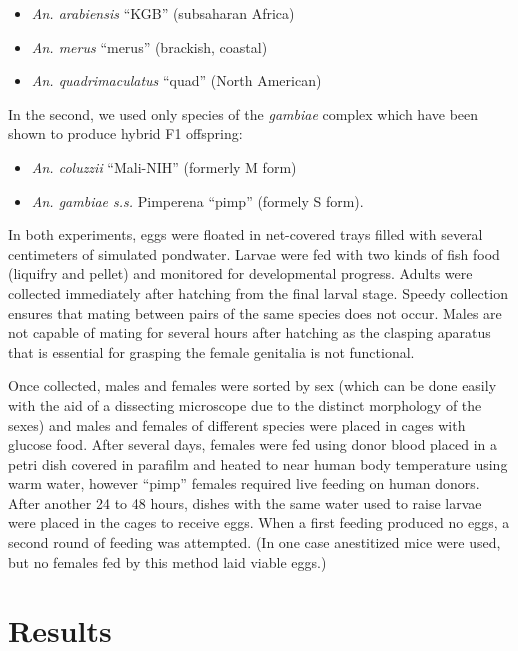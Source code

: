 \documentclass{article}
\begin{document}
\begin{itemize}
\item \emph{An. arabiensis} ``KGB'' (subsaharan Africa)
\item \emph{An. merus} ``merus'' (brackish, coastal)
\item \emph{An. quadrimaculatus} ``quad'' (North American)
\end{itemize}

In the second, we used only species of the \emph{gambiae} complex which have been shown to produce hybrid F1 offspring:

\begin{itemize}
\item \emph{An. coluzzii} ``Mali-NIH'' (formerly M form)
\item \emph{An. gambiae s.s.} Pimperena ``pimp'' (formely S form).
\end{itemize}

In both experiments, eggs were floated in net-covered trays filled with several centimeters of simulated pondwater. Larvae were fed with two kinds of fish food (liquifry and pellet) and monitored for developmental progress. Adults were collected immediately after hatching from the final larval stage. Speedy collection ensures that mating between pairs of the same species does not occur. Males are not capable of mating for several hours after hatching as the clasping aparatus that is essential for grasping the female genitalia is not functional.

Once collected, males and females were sorted by sex (which can be done easily with the aid of a dissecting microscope due to the distinct morphology of the sexes) and males and females of different species were placed in cages with glucose food. After several days, females were fed using donor blood placed in a petri dish covered in parafilm and heated to near human body temperature using warm water, however ``pimp'' females required live feeding on human donors. After another 24 to 48 hours, dishes with the same water used to raise larvae were placed in the cages to receive eggs. When a first feeding produced no eggs, a second round of feeding was attempted. (In one case anestitized mice were used, but no females fed by this method laid viable eggs.)

\section{Results}


{}
\end{document}
